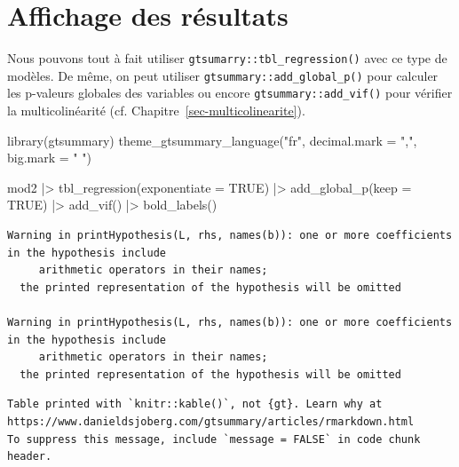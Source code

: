 \documentclass[
  letterpaper,
  DIV=11,
  numbers=noendperiod,
  oneside]{scrreprt}
\newenvironment{Shaded}{\begin{snugshade}}{\end{snugshade}}
\newcommand{\AttributeTok}[1]{\textcolor[rgb]{0.40,0.45,0.13}{#1}}
\newcommand{\ConstantTok}[1]{\textcolor[rgb]{0.56,0.35,0.01}{#1}}
\newcommand{\FunctionTok}[1]{\textcolor[rgb]{0.28,0.35,0.67}{#1}}
\newcommand{\NormalTok}[1]{\textcolor[rgb]{0.00,0.23,0.31}{#1}}
\newcommand{\SpecialCharTok}[1]{\textcolor[rgb]{0.37,0.37,0.37}{#1}}
\newcommand{\StringTok}[1]{\textcolor[rgb]{0.13,0.47,0.30}{#1}}
\begin{document}
\hypertarget{affichage-des-ruxe9sultats}{%
\section{Affichage des résultats}\label{affichage-des-ruxe9sultats}}

Nous pouvons tout à fait utiliser \texttt{gtsumarry::tbl\_regression()}
avec ce type de modèles. De même, on peut utiliser
\texttt{gtsummary::add\_global\_p()} pour calculer les p-valeurs
globales des variables ou encore \texttt{gtsummary::add\_vif()} pour
vérifier la multicolinéarité (cf. Chapitre~\ref{sec-multicolinearite}).

\begin{Shaded}
\begin{Highlighting}[]
\FunctionTok{library}\NormalTok{(gtsummary)}
\FunctionTok{theme\_gtsummary\_language}\NormalTok{(}\StringTok{"fr"}\NormalTok{, }\AttributeTok{decimal.mark =} \StringTok{","}\NormalTok{, }\AttributeTok{big.mark =} \StringTok{" "}\NormalTok{)}
\end{Highlighting}
\end{Shaded}

\begin{Shaded}
\begin{Highlighting}[]
\NormalTok{mod2 }\SpecialCharTok{|\textgreater{}} 
  \FunctionTok{tbl\_regression}\NormalTok{(}\AttributeTok{exponentiate =} \ConstantTok{TRUE}\NormalTok{) }\SpecialCharTok{|\textgreater{}} 
  \FunctionTok{add\_global\_p}\NormalTok{(}\AttributeTok{keep =} \ConstantTok{TRUE}\NormalTok{) }\SpecialCharTok{|\textgreater{}} 
  \FunctionTok{add\_vif}\NormalTok{() }\SpecialCharTok{|\textgreater{}} 
  \FunctionTok{bold\_labels}\NormalTok{()}
\end{Highlighting}
\end{Shaded}

\begin{verbatim}
Warning in printHypothesis(L, rhs, names(b)): one or more coefficients in the hypothesis include
     arithmetic operators in their names;
  the printed representation of the hypothesis will be omitted

Warning in printHypothesis(L, rhs, names(b)): one or more coefficients in the hypothesis include
     arithmetic operators in their names;
  the printed representation of the hypothesis will be omitted
\end{verbatim}

\begin{verbatim}
Table printed with `knitr::kable()`, not {gt}. Learn why at
https://www.danieldsjoberg.com/gtsummary/articles/rmarkdown.html
To suppress this message, include `message = FALSE` in code chunk header.
\end{verbatim}
\end{document}
